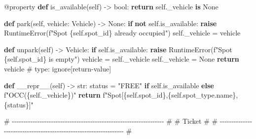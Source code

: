 \documentclass[11pt]{article}
\newenvironment{Shaded}{\begin{snugshade}}{\end{snugshade}}
\newcommand{\AttributeTok}[1]{\textcolor[rgb]{0.16,0.50,0.73}{#1}}
\newcommand{\BuiltInTok}[1]{\textcolor[rgb]{0.50,0.55,0.55}{#1}}
\newcommand{\CommentTok}[1]{\textcolor[rgb]{0.48,0.49,0.49}{#1}}
\newcommand{\ControlFlowTok}[1]{\textcolor[rgb]{0.99,0.74,0.29}{\textbf{#1}}}
\newcommand{\FunctionTok}[1]{\textcolor[rgb]{0.56,0.27,0.68}{#1}}
\newcommand{\KeywordTok}[1]{\textcolor[rgb]{0.81,0.81,0.76}{\textbf{#1}}}
\newcommand{\NormalTok}[1]{\textcolor[rgb]{0.81,0.81,0.76}{#1}}
\newcommand{\OperatorTok}[1]{\textcolor[rgb]{0.81,0.81,0.76}{#1}}
\newcommand{\PreprocessorTok}[1]{\textcolor[rgb]{0.15,0.68,0.38}{#1}}
\newcommand{\SpecialCharTok}[1]{\textcolor[rgb]{0.24,0.68,0.91}{#1}}
\newcommand{\SpecialStringTok}[1]{\textcolor[rgb]{0.85,0.27,0.33}{#1}}
\newcommand{\StringTok}[1]{\textcolor[rgb]{0.96,0.31,0.31}{#1}}
\newcommand{\VariableTok}[1]{\textcolor[rgb]{0.15,0.68,0.68}{#1}}
\begin{document}
\begin{Shaded}
\begin{Highlighting}[]
    \AttributeTok{@property}
    \KeywordTok{def}\NormalTok{ is\_available(}\VariableTok{self}\NormalTok{) }\OperatorTok{{-}\textgreater{}} \BuiltInTok{bool}\NormalTok{:}
        \ControlFlowTok{return} \VariableTok{self}\NormalTok{.\_vehicle }\KeywordTok{is} \VariableTok{None}

    \KeywordTok{def}\NormalTok{ park(}\VariableTok{self}\NormalTok{, vehicle: Vehicle) }\OperatorTok{{-}\textgreater{}} \VariableTok{None}\NormalTok{:}
        \ControlFlowTok{if} \KeywordTok{not} \VariableTok{self}\NormalTok{.is\_available:}
            \ControlFlowTok{raise} \PreprocessorTok{RuntimeError}\NormalTok{(}\SpecialStringTok{f"Spot }\SpecialCharTok{\{}\VariableTok{self}\SpecialCharTok{.}\NormalTok{spot\_id}\SpecialCharTok{\}}\SpecialStringTok{ already occupied"}\NormalTok{)}
        \VariableTok{self}\NormalTok{.\_vehicle }\OperatorTok{=}\NormalTok{ vehicle}

    \KeywordTok{def}\NormalTok{ unpark(}\VariableTok{self}\NormalTok{) }\OperatorTok{{-}\textgreater{}}\NormalTok{ Vehicle:}
        \ControlFlowTok{if} \VariableTok{self}\NormalTok{.is\_available:}
            \ControlFlowTok{raise} \PreprocessorTok{RuntimeError}\NormalTok{(}\SpecialStringTok{f"Spot }\SpecialCharTok{\{}\VariableTok{self}\SpecialCharTok{.}\NormalTok{spot\_id}\SpecialCharTok{\}}\SpecialStringTok{ is empty"}\NormalTok{)}
\NormalTok{        vehicle }\OperatorTok{=} \VariableTok{self}\NormalTok{.\_vehicle}
        \VariableTok{self}\NormalTok{.\_vehicle }\OperatorTok{=} \VariableTok{None}
        \ControlFlowTok{return}\NormalTok{ vehicle  }\CommentTok{\# type: ignore[return{-}value]}

    \KeywordTok{def} \FunctionTok{\_\_repr\_\_}\NormalTok{(}\VariableTok{self}\NormalTok{) }\OperatorTok{{-}\textgreater{}} \BuiltInTok{str}\NormalTok{:}
\NormalTok{        status }\OperatorTok{=} \StringTok{"FREE"} \ControlFlowTok{if} \VariableTok{self}\NormalTok{.is\_available }\ControlFlowTok{else} \SpecialStringTok{f"OCC(}\SpecialCharTok{\{}\VariableTok{self}\SpecialCharTok{.}\NormalTok{\_vehicle}\SpecialCharTok{\}}\SpecialStringTok{)"}
        \ControlFlowTok{return} \SpecialStringTok{f"Spot[}\SpecialCharTok{\{}\VariableTok{self}\SpecialCharTok{.}\NormalTok{spot\_id}\SpecialCharTok{\}}\SpecialStringTok{,}\SpecialCharTok{\{}\VariableTok{self}\SpecialCharTok{.}\NormalTok{spot\_type}\SpecialCharTok{.}\NormalTok{name}\SpecialCharTok{\}}\SpecialStringTok{,}\SpecialCharTok{\{}\NormalTok{status}\SpecialCharTok{\}}\SpecialStringTok{]"}


\CommentTok{\# {-}{-}{-}{-}{-}{-}{-}{-}{-}{-}{-}{-}{-}{-}{-}{-}{-}{-}{-}{-}{-}{-}{-}{-}{-}{-}{-}{-}{-}{-}{-}{-}{-}{-}{-}{-}{-}{-}{-}{-}{-}{-}{-}{-}{-}{-}{-}{-}{-}{-}{-}{-}{-}{-}{-}{-}{-}{-}{-}{-}{-}{-}{-}{-}{-}{-} \#}
\CommentTok{\# Ticket                                                              \#}
\CommentTok{\# {-}{-}{-}{-}{-}{-}{-}{-}{-}{-}{-}{-}{-}{-}{-}{-}{-}{-}{-}{-}{-}{-}{-}{-}{-}{-}{-}{-}{-}{-}{-}{-}{-}{-}{-}{-}{-}{-}{-}{-}{-}{-}{-}{-}{-}{-}{-}{-}{-}{-}{-}{-}{-}{-}{-}{-}{-}{-}{-}{-}{-}{-}{-}{-}{-}{-} \#}


\end{Highlighting}
\end{Shaded}
\end{document}
